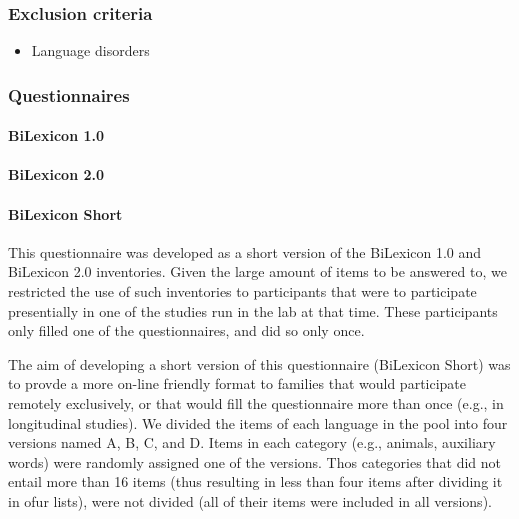 \documentclass[english,man,man,floatsintext]{apa6}
\providecommand{\tightlist}{%
  \setlength{\itemsep}{0pt}\setlength{\parskip}{0pt}}
\begin{document}
\hypertarget{exclusion-criteria}{%
\subsubsection{Exclusion criteria}\label{exclusion-criteria}}

\begin{itemize}
\tightlist
\item
  Language disorders
\end{itemize}

\hypertarget{questionnaires}{%
\subsubsection{Questionnaires}\label{questionnaires}}

\hypertarget{bilexicon-1.0}{%
\paragraph{BiLexicon 1.0}\label{bilexicon-1.0}}

\hypertarget{bilexicon-2.0}{%
\paragraph{BiLexicon 2.0}\label{bilexicon-2.0}}

\hypertarget{bilexicon-short}{%
\paragraph{BiLexicon Short}\label{bilexicon-short}}

This questionnaire was developed as a short version of the BiLexicon 1.0 and BiLexicon 2.0 inventories. Given the large amount of items to be answered to, we restricted the use of such inventories to participants that were to participate presentially in one of the studies run in the lab at that time. These participants only filled one of the questionnaires, and did so only once.

The aim of developing a short version of this questionnaire (BiLexicon Short) was to provde a more on-line friendly format to families that would participate remotely exclusively, or that would fill the questionnaire more than once (e.g., in longitudinal studies). We divided the items of each language in the pool into four versions named A, B, C, and D. Items in each category (e.g., animals, auxiliary words) were randomly assigned one of the versions. Thos categories that did not entail more than 16 items (thus resulting in less than four items after dividing it in ofur lists), were not divided (all of their items were included in all versions).
\end{document}
